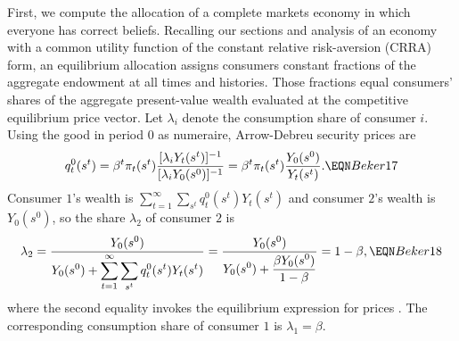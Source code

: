 First, we compute the allocation of a complete markets economy in which everyone has
correct beliefs. Recalling  our sections
 and  analysis
of an economy with a common utility function of the constant relative
risk-aversion (CRRA) form, an equilibrium allocation assigns
 consumers  constant fractions of the aggregate endowment
at all times and histories.   Those fractions equal  consumers' shares of the aggregate
present-value wealth evaluated at the competitive equilibrium price
vector. Let $\lambda_i$ denote the consumption share of consumer $i$.
Using the good in period $0$ as  numeraire,  Arrow-Debreu
security prices are
$$
q^0_t(s^t) = \beta^t \pi_t(s^t) { [\lambda_i Y_t(s^t)]^{-1} \over
             [\lambda_i Y_0(s^0)]^{-1} }
           = \beta^t \pi_t(s^t) { Y_0(s^0) \over Y_t(s^t) }.  \EQN Beker17
$$
Consumer $1$'s wealth is
$\sum_{t=1}^\infty \sum_{s^t} q^0_t(s^t) Y_t(s^t)$ and consumer $2$'s
wealth is $Y_0(s^0)$, so the share $\lambda_2$ of consumer $2$ is
$$
\lambda_2 = { \displaystyle Y_0(s^0) \over \displaystyle
Y_0(s^0) + \sum_{t=1}^\infty \sum_{s^t} q^0_t(s^t) Y_t(s^t) }
          = {\displaystyle Y_0(s^0) \over \displaystyle
Y_0(s^0) + {\displaystyle \beta Y_0(s^0) \over \displaystyle 1-\beta }}
= 1-\beta,                                                    \EQN Beker18
$$
where the second equality invokes the equilibrium expression
for prices . The corresponding consumption share of
consumer $1$ is $\lambda_1= \beta$.

